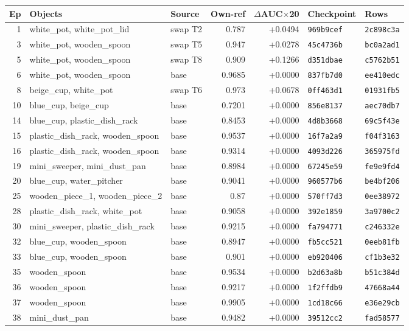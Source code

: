 \begin{tabular}{@{}rllrrll@{}}
\toprule
Ep & Objects & Source & Own-ref & $\Delta$AUC$\times$20 & Checkpoint & Rows \\
\midrule
1 & white\_pot, white\_pot\_lid & swap T2 & 0.787 & +0.0494 & \texttt{969b9cef} & \texttt{2c898c3a} \\
3 & white\_pot, wooden\_spoon & swap T5 & 0.947 & +0.0278 & \texttt{45c4736b} & \texttt{bc0a2ad1} \\
5 & white\_pot, wooden\_spoon & swap T8 & 0.909 & +0.1266 & \texttt{d351dbae} & \texttt{c5762b51} \\
6 & white\_pot, wooden\_spoon & base & 0.9685 & +0.0000 & \texttt{837fb7d0} & \texttt{ee410edc} \\
8 & beige\_cup, white\_pot & swap T6 & 0.973 & +0.0678 & \texttt{0ff463d1} & \texttt{01931fb5} \\
10 & blue\_cup, beige\_cup & base & 0.7201 & +0.0000 & \texttt{856e8137} & \texttt{aec70db7} \\
14 & blue\_cup, plastic\_dish\_rack & base & 0.8453 & +0.0000 & \texttt{4d8b3668} & \texttt{69c5f43e} \\
15 & plastic\_dish\_rack, wooden\_spoon & base & 0.9537 & +0.0000 & \texttt{16f7a2a9} & \texttt{f04f3163} \\
16 & plastic\_dish\_rack, wooden\_spoon & base & 0.9314 & +0.0000 & \texttt{4093d226} & \texttt{365975fd} \\
19 & mini\_sweeper, mini\_dust\_pan & base & 0.8984 & +0.0000 & \texttt{67245e59} & \texttt{fe9e9fd4} \\
20 & blue\_cup, water\_pitcher & base & 0.9041 & +0.0000 & \texttt{960577b6} & \texttt{be4bf206} \\
25 & wooden\_piece\_1, wooden\_piece\_2 & base & 0.87 & +0.0000 & \texttt{570ff7d3} & \texttt{0ee38972} \\
28 & plastic\_dish\_rack, white\_pot & base & 0.9058 & +0.0000 & \texttt{392e1859} & \texttt{3a9700c2} \\
30 & mini\_sweeper, plastic\_dish\_rack & base & 0.9215 & +0.0000 & \texttt{fa794771} & \texttt{c246332e} \\
32 & blue\_cup, wooden\_spoon & base & 0.8947 & +0.0000 & \texttt{fb5cc521} & \texttt{0eeb81fb} \\
33 & blue\_cup, wooden\_spoon & base & 0.901 & +0.0000 & \texttt{eb920406} & \texttt{cf1b3e32} \\
35 & wooden\_spoon & base & 0.9534 & +0.0000 & \texttt{b2d63a8b} & \texttt{b51c384d} \\
36 & wooden\_spoon & base & 0.9217 & +0.0000 & \texttt{1f2ffdb9} & \texttt{47668a44} \\
37 & wooden\_spoon & base & 0.9905 & +0.0000 & \texttt{1cd18c66} & \texttt{e36e29cb} \\
38 & mini\_dust\_pan & base & 0.9482 & +0.0000 & \texttt{39512cc2} & \texttt{fad58577} \\
\bottomrule
\end{tabular}
